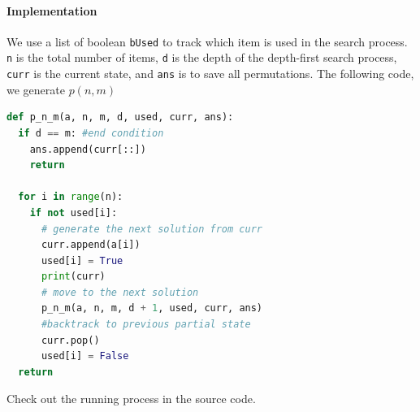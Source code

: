 \documentclass[../main.tex]{subfiles}
\begin{document}
\paragraph{Implementation} We  use a list of boolean \texttt{bUsed} to track which item is used in the search process. 
\texttt{n} is the total number of items, \texttt{d} is the depth of the depth-first search process, \texttt{curr} is the current state, and \texttt{ans} is to save all permutations. The following code, we generate $p(n, m)$
\begin{lstlisting}[language=Python]
def p_n_m(a, n, m, d, used, curr, ans):
  if d == m: #end condition
    ans.append(curr[::]) 
    return
  
  for i in range(n):
    if not used[i]:
      # generate the next solution from curr
      curr.append(a[i])
      used[i] = True
      print(curr)
      # move to the next solution
      p_n_m(a, n, m, d + 1, used, curr, ans)
      #backtrack to previous partial state
      curr.pop()
      used[i] = False
  return
\end{lstlisting}
Check out the running process in the source code.
\end{document}
